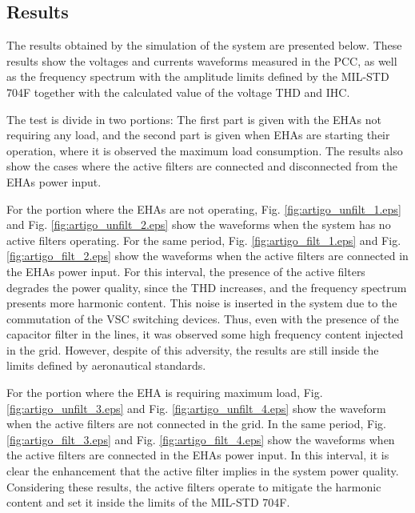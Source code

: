 \subsection{Results}

The results obtained by the simulation of the system are presented below. These results show the voltages and currents waveforms measured in the PCC, as well as the frequency spectrum with the amplitude limits defined by the MIL-STD 704F together with the calculated value of the voltage THD and IHC.

The test is divide in two portions: The first part is given with the EHAs not requiring any load, and the second part is given when EHAs are starting their operation, where it is observed the maximum load consumption. The results also show the cases where the active filters are connected and disconnected from the EHAs power input.

For the portion where the EHAs are not operating, Fig. \ref{fig:artigo_unfilt_1.eps} and Fig. \ref{fig:artigo_unfilt_2.eps} show the waveforms when the system has no active filters operating. For the same period, Fig. \ref{fig:artigo_filt_1.eps} and Fig. \ref{fig:artigo_filt_2.eps} show the waveforms when the active filters are connected in the EHAs power input. For this interval, the presence of the active filters degrades the power quality, since the THD increases, and the frequency spectrum presents more harmonic content. This noise is inserted in the system due to the commutation of the VSC switching devices. Thus, even with the presence of the capacitor filter in the lines, it was observed some high frequency content injected in the grid. However, despite of this adversity, the results are still inside the limits defined by aeronautical standards.

For the portion where the EHA is requiring maximum load, Fig. \ref{fig:artigo_unfilt_3.eps} and Fig. \ref{fig:artigo_unfilt_4.eps} show the waveform when the active filters are not connected in the grid. In the same period, Fig. \ref{fig:artigo_filt_3.eps} and Fig. \ref{fig:artigo_filt_4.eps} show the waveforms when the active filters are connected in the EHAs power input. In this interval, it is clear the enhancement that the active filter implies in the system power quality. Considering these results, the active filters operate to mitigate the harmonic content and set it inside the limits of the MIL-STD 704F.


